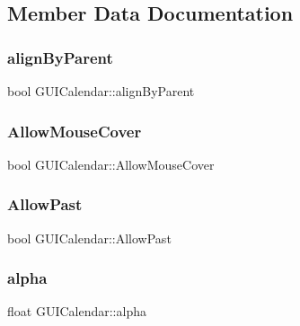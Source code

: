 \subsection{Member Data Documentation}
\hypertarget{class_g_u_i_calendar_acbc42e806913733d358b29c9575b11a5}{}\label{class_g_u_i_calendar_acbc42e806913733d358b29c9575b11a5} 
\subsubsection{\texorpdfstring{align\+By\+Parent}{alignByParent}}
{\footnotesize\ttfamily bool G\+U\+I\+Calendar\+::align\+By\+Parent}

\hypertarget{class_g_u_i_calendar_ab568256e1946305f1e64b79eccd46ab4}{}\label{class_g_u_i_calendar_ab568256e1946305f1e64b79eccd46ab4} 
\subsubsection{\texorpdfstring{Allow\+Mouse\+Cover}{AllowMouseCover}}
{\footnotesize\ttfamily bool G\+U\+I\+Calendar\+::\+Allow\+Mouse\+Cover}

\hypertarget{class_g_u_i_calendar_aef7dc09b05deedefa98729133e67e0b8}{}\label{class_g_u_i_calendar_aef7dc09b05deedefa98729133e67e0b8} 
\subsubsection{\texorpdfstring{Allow\+Past}{AllowPast}}
{\footnotesize\ttfamily bool G\+U\+I\+Calendar\+::\+Allow\+Past}

\hypertarget{class_g_u_i_calendar_aaadeb05609b37721450933ec8b6cce00}{}\label{class_g_u_i_calendar_aaadeb05609b37721450933ec8b6cce00} 
\subsubsection{\texorpdfstring{alpha}{alpha}}
{\footnotesize\ttfamily float G\+U\+I\+Calendar\+::alpha}

